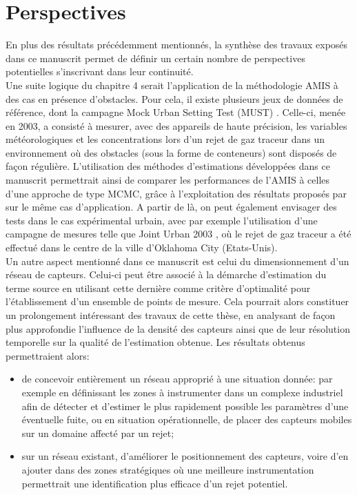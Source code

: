 \section{Perspectives}

En plus des résultats précédemment mentionnés, la synthèse des travaux exposés dans ce manuscrit permet de définir un certain nombre de perspectives potentielles s'inscrivant dans leur continuité.\\

Une suite logique du chapitre 4 serait l'application de la méthodologie AMIS à des cas  en présence d'obstacles. Pour cela, il existe plusieurs jeux de données de référence, dont la campagne Mock Urban Setting Test (MUST) \cite{Yee2004}. Celle-ci, menée en 2003, a consisté à mesurer, avec des appareils de haute précision, les variables météorologiques et les concentrations lors d'un rejet de gaz traceur dans un environnement où des obstacles (sous la forme de conteneurs) sont disposés de façon régulière. L'utilisation des méthodes d'estimations développées dans ce manuscrit permettrait ainsi de comparer les performances de l'AMIS à celles d'une approche de type MCMC, grâce à l'exploitation des résultats proposés par \cite{Keats2007} sur le même cas d'application. A partir de là, on peut également envisager des tests dans le cas expérimental urbain, avec par exemple l'utilisation d'une campagne de mesures telle que Joint Urban 2003 \cite{Allwine2004}, où le rejet de gaz traceur a été effectué dans le centre de la ville d'Oklahoma City (Etats-Unis).\\

Un autre aspect mentionné dans ce manuscrit est celui du dimensionnement d'un réseau de capteurs. Celui-ci peut être associé à la démarche d'estimation du terme source en utilisant cette dernière comme critère d'optimalité pour l'établissement d'un ensemble de points de mesure. Cela pourrait alors constituer un prolongement intéressant des travaux de cette thèse, en analysant de façon plus approfondie l'influence de la densité des capteurs ainsi que de leur résolution temporelle sur la qualité de l'estimation obtenue. Les résultats obtenus permettraient alors: 
\begin{itemize}
	\item de concevoir entièrement un réseau approprié à une situation donnée: par exemple en définissant les zones à instrumenter dans un complexe industriel afin de détecter et d'estimer le plus rapidement possible les paramètres d'une éventuelle fuite, ou en situation opérationnelle, de placer des capteurs mobiles sur un domaine affecté par un rejet;
	\item sur un réseau existant, d'améliorer le positionnement des capteurs, voire d'en ajouter dans des zones stratégiques où une meilleure instrumentation permettrait une identification plus efficace d'un rejet potentiel.
\end{itemize}

